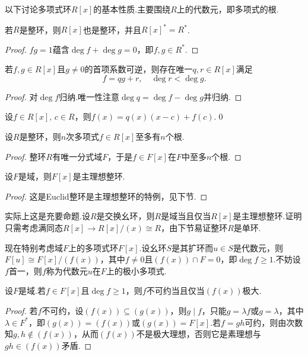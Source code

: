 \medskip 以下讨论多项式环$R[x]$的基本性质.主要围绕$R$上的代数元，即多项式的根.
\begin{lemma*}
    若$R$是整环，则$R[x]$也是整环，并且$R[x]^*=R^*$.
\end{lemma*}
\begin{proof}
    $fg=1$蕴含$\deg f+\deg g=0$，即$f,g\in R^*$.
\end{proof}
\begin{prop}
    若$f,g\in R[x]$且$g\ne 0$的首项系数可逆，则存在唯一$q,r\in R[x]$满足
    \[
        f=qg+r,\quad\deg r<\deg g.
    \]
\end{prop}
\begin{proof}
    对$\deg f$归纳.唯一性注意$\deg q=\deg f-\deg g$并归纳.
\end{proof}
\begin{cor*}
    设$f\in R[x],\,c\in R$，则$f(x)=q(x)(x-c)+f(c)$.\qed
\end{cor*}
\begin{prop}
    设$R$是整环，则$n$次多项式$f\in R[x]$至多有$n$个根.
\end{prop}
\begin{proof}
    整环$R$有唯一分式域$F$，于是$f\in F[x]$在$F$中至多$n$个根.
\end{proof}
\begin{prop}
    设$F$是域，则$F[x]$是主理想整环.
\end{prop}
\begin{proof}
    这是Euclid整环是主理想整环的特例，见下节.
\end{proof}
\begin{remark}
    实际上这是充要命题.设$R$是交换幺环，则$R$是域当且仅当$R[x]$是主理想整环.证明只需考虑满同态$R[x]\to R[x]/(x)\cong R$，由下节易证整环$R$是单环.
\end{remark}

现在特别考虑域$F$上的多项式环$F[x]$.设幺环$S$是其扩环而$u\in S$是代数元，则$F[u]\cong F[x]/(f(x))$，其中$f\ne 0$且$(f(x))\cap F=0$，即$\deg f\ge 1$.不妨设$f$首一，则$f$称为代数元$u$在$F$上的{\heiti 极小多项式}.
\begin{prop}
    设$F$是域.若$f\in F[x]$且$\deg f\ge 1$，则$f$不可约当且仅当$(f(x))$极大.
\end{prop}
\begin{proof}
    若$f$不可约，设$(f(x))\subseteq (g(x))$，则$g\mid f$，只能$g=\lambda f$或$g=\lambda$，其中$\lambda\in F^*$，即$(g(x))=(f(x))$或$(g(x))=F[x]$.若$f=gh$可约，则由次数知$g,h\notin (f(x))$，从而$(f(x))$不是极大理想，否则它是素理想与$gh\in(f(x))$矛盾.
\end{proof}

